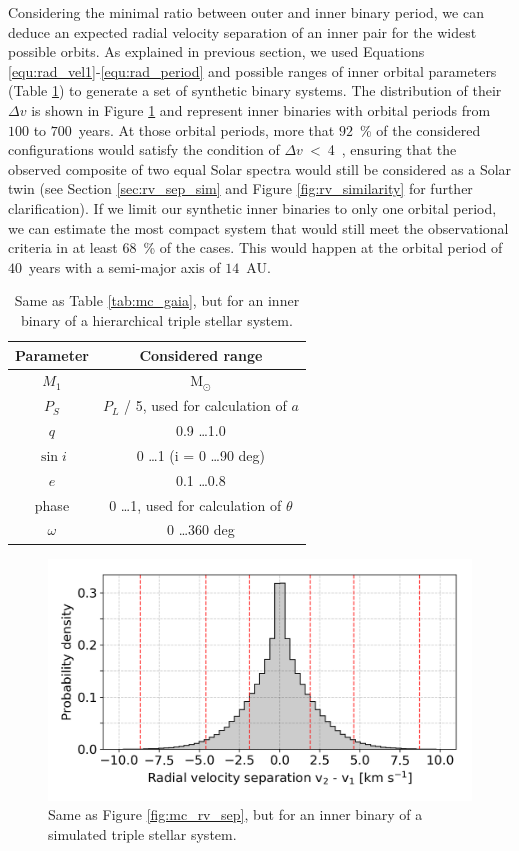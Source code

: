 Considering the minimal ratio between outer and inner binary period, we can deduce an expected radial velocity separation of an inner pair for the widest possible orbits. As explained in previous section, we used Equations \ref{equ:rad_vel1}-\ref{equ:rad_period} and possible ranges of inner orbital parameters (Table \ref{tab:mc_gaia_inner}) to generate a set of synthetic binary systems. The distribution of their $\Delta v$ is shown in Figure \ref{fig:mc_rv_sep_inner} and represent inner binaries with orbital periods from $100$ to $700$~years. At those orbital periods, more that $92$~\% of the considered configurations would satisfy the condition of $\Delta v$~<~4~\kms, ensuring that the observed composite of two equal Solar spectra would still be considered as a Solar twin (see Section \ref{sec:rv_sep_sim} and Figure \ref{fig:rv_similarity} for further clarification). If we limit our synthetic inner binaries to only one orbital period, we can estimate the most compact system that would still meet the observational criteria in at least $68$~\% of the cases. This would happen at the orbital period of $40$~years with a semi-major axis of $14$~AU. 

\begin{table}
	\centering
	\caption{Same as Table \ref{tab:mc_gaia}, but for an inner binary of a hierarchical triple stellar system.}
	\begin{tabular}{c | c}
		\hline
		Parameter & Considered range \\ 
		\hline
		$M_1$ & M$_{\odot}$ \\
		$P_S$ & $P_L$ / 5, used for calculation of $a$ \\
		$q$ & 0.9 \ldots 1.0 \\
		$\sin i$ & 0 \ldots 1 (i = 0 \ldots 90 deg)\\
		$e$ & 0.1 \ldots 0.8 \\
		phase & 0 \ldots 1, used for calculation of $\theta$ \\
		$\omega$ & 0 \ldots 360 deg \\
		\hline
	\end{tabular}
	\label{tab:mc_gaia_inner}
\end{table}

\begin{figure}
	\centering
	\includegraphics[width=\columnwidth]{MC_rv_from_sep_inner.png}
	\caption{Same as Figure \ref{fig:mc_rv_sep}, but for an inner binary of a simulated triple stellar system.}
	\label{fig:mc_rv_sep_inner}
\end{figure}

